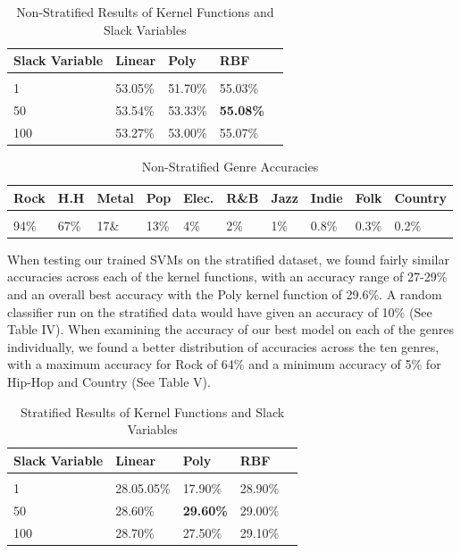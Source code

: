 \documentclass[journal]{IEEEtran}
\begin{document}
\begin{table}[h!]
    \label{tab:table2}
    \caption{Non-Stratified Results of Kernel Functions and Slack Variables}
    \begin{tabular}{l|l|l|ll}
      \textbf{Slack Variable} & \textbf{Linear} & \textbf{Poly} & \textbf{RBF}\\

      \hline
      \\
	1 & 53.05\% & 51.70\% & 55.03\%\\
	50 & 53.54\% & 53.33\% & \textbf{55.08\%}\\
	100 & 53.27\% & 53.00\% & 55.07\%\\

    \end{tabular}
\end{table}


\begin{table}[h!]
    \label{tab:table1}
    \caption{Non-Stratified Genre Accuracies}
    \begin{tabular}{|m{0.4cm}|m{0.4cm}|m{0.5cm}|m{0.45cm}|m{0.4cm}|m{0.4cm}|m{0.45cm}|m{0.4cm}|m{0.4cm}|m{0.4cm}}
    \textbf{Rock} & \textbf{H.H} & \textbf{Metal} & \textbf{Pop} & \textbf{Elec.} & \textbf{R\&B} & \textbf{Jazz} & \textbf{Indie} & \textbf{Folk} & \textbf{Country}\\
      \hline
      \\
	94\% & 67\% & 17\& & 13\% & 4\% & 2\% & 1\% & 0.8\% & 0.3\% & 0.2\%\\

    \end{tabular}
\end{table}

When testing our trained SVMs on the stratified dataset, we found fairly similar accuracies across each of the kernel functions, with an accuracy range of 27-29\% and an overall best accuracy with the Poly kernel function of 29.6\%. A random classifier run on the stratified data would have given an accuracy of 10\% (See Table IV). When examining the accuracy of our best model on each of the genres individually, we found a better distribution of accuracies across the ten genres, with a maximum accuracy for Rock of 64\%  and a minimum accuracy of 5\% for Hip-Hop and Country (See Table V).

\begin{table}[h!]
    \label{tab:table1}
    \caption{Stratified Results of Kernel Functions and Slack Variables}
    \begin{tabular}{l|l|l|ll}
      \textbf{Slack Variable} & \textbf{Linear} & \textbf{Poly} & \textbf{RBF}\\

      \hline
      \\
	1 & 28.05.05\% & 17.90\% & 28.90\%\\
	50 & 28.60\% & \textbf{29.60\%} & 29.00\%\\
	100 & 28.70\% & 27.50\% & 29.10\%\\

    \end{tabular}
\end{table}
\end{document}
